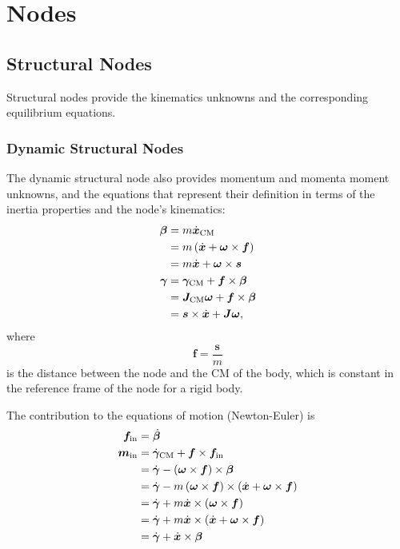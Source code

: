 \documentclass[10pt,dvips,fleqn,subeqn]{report}
\newcommand{\T}[1]{\bm{#1}}
\newcommand{\TT}[1]{\bm{#1}}
\begin{document}
\chapter{Nodes}
\label{sec:nodes}

\section{Structural Nodes}
\label{sec:nodes:structural nodes}
Structural nodes provide the kinematics unknowns
and the corresponding equilibrium equations.

\subsection{Dynamic Structural Nodes}
\label{sec:nodes:structural nodes:dynamic structural nodes}
The dynamic structural node also provides momentum and momenta moment
unknowns, and the equations that represent their definition
in terms of the inertia properties and the node's kinematics:
\begin{subequations}
\label{eq:body:momenta}
\begin{align}
	\T{\beta}
	&= m \dot{\T{x}}_{\text{CM}} \nonumber \\
	&= m \plbr{\dot{\T{x}} + \T{\omega}\times\T{f}} \nonumber \\
	&= m \dot{\T{x}} + \T{\omega} \times \T{s}
	\label{eq:body:momentum} \\
	\T{\gamma}
	&= \T{\gamma}_{\text{CM}} + \T{f} \times\T{\beta} \nonumber \\
	&= \TT{J}_{\text{CM}} \T{\omega} + \T{f} \times\T{\beta} \nonumber \\
	&= \T{s} \times \dot{\T{x}} + \TT{J} \T{\omega}
	\label{eq:body:momenta-moment} ,
\end{align}
\end{subequations}
where
\begin{equation}
	\T{f} = \frac{\T{s}}{m}
\end{equation}
is the distance between the node and the CM of the body,
which is constant in the reference frame of the node
for a rigid body.

The contribution to the equations of motion (Newton-Euler) is
\begin{subequations}
\begin{align}
	\T{f}_{\text{in}} &= \dot{\T{\beta}} \\
	\T{m}_{\text{in}} &= \dot{\T{\gamma}}_{\text{CM}} + \T{f}\times\T{f}_{\text{in}} \nonumber \\
	&= \dot{\T{\gamma}} - \plbr{\T{\omega}\times\T{f}}\times\T{\beta} \nonumber \\
	&= \dot{\T{\gamma}} - m \plbr{\T{\omega}\times\T{f}}\times\plbr{\dot{\T{x}} + \T{\omega}\times\T{f}} \nonumber \\
	&= \dot{\T{\gamma}} + m \dot{\T{x}}\times\plbr{\T{\omega}\times\T{f}} \nonumber \\
	&= \dot{\T{\gamma}} + m \dot{\T{x}}\times\plbr{\dot{\T{x}} + \T{\omega}\times\T{f}} \nonumber \\
	&= \dot{\T{\gamma}} + \dot{\T{x}}\times\T{\beta}
\end{align}
\end{subequations}
\end{document}
